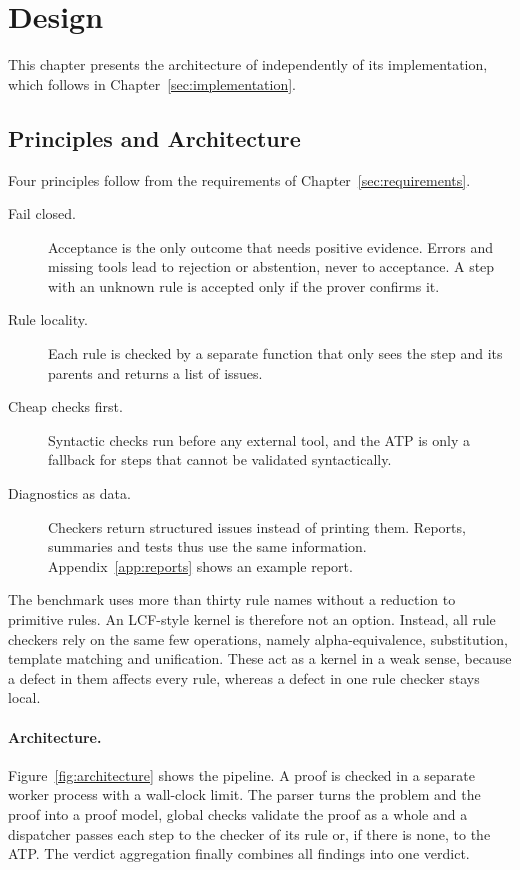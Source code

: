 \section{Design}
\label{sec:design}

This chapter presents the architecture of \TSTPy{} independently of its implementation, which follows in Chapter~\ref{sec:implementation}.

\subsection{Principles and Architecture}
\label{subsec:design-principles}

Four principles follow from the requirements of Chapter~\ref{sec:requirements}.
\begin{description}
  \item[Fail closed.] Acceptance is the only outcome that needs positive evidence. Errors and missing tools lead to rejection or abstention, never to acceptance. A step with an unknown rule is accepted only if the prover confirms it.
  \item[Rule locality.] Each rule is checked by a separate function that only sees the step and its parents and returns a list of issues.
  \item[Cheap checks first.] Syntactic checks run before any external tool, and the ATP is only a fallback for steps that cannot be validated syntactically.
  \item[Diagnostics as data.] Checkers return structured issues instead of printing them. Reports, summaries and tests thus use the same information. Appendix~\ref{app:reports} shows an example report.
\end{description}
The benchmark uses more than thirty rule names without a reduction to primitive rules. An LCF-style kernel is therefore not an option.
Instead, all rule checkers rely on the same few operations, namely alpha-equivalence, substitution, template matching and unification. These act as a kernel in a weak sense, because a defect in them affects every rule, whereas a defect in one rule checker stays local.

\paragraph{Architecture.}
\label{subsec:design-overview}

Figure~\ref{fig:architecture} shows the pipeline.
A proof is checked in a separate worker process with a wall-clock limit.
The parser turns the problem and the proof into a proof model, global checks validate the proof as a whole and a dispatcher passes each step to the checker of its rule or, if there is none, to the ATP.
The verdict aggregation finally combines all findings into one verdict.

